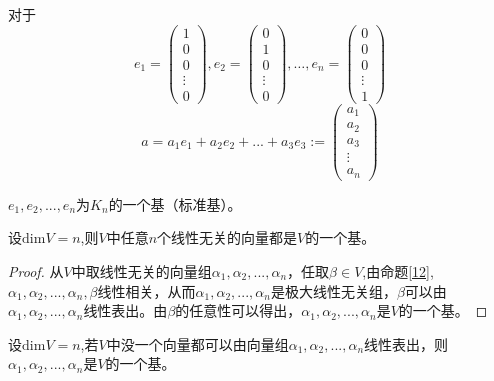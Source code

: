 \documentclass[blue,normal,cn]{elegantnote}
\begin{document}
对于
$$
     e_1=\begin{pmatrix} 
            1\\
            0\\
            0\\
            \vdots\\
            0
         \end{pmatrix}
         ,e_2=\begin{pmatrix} 
                0\\
                1\\
                0\\
                \vdots\\
                0
            \end{pmatrix}
            ,\dots
        ,e_n=\begin{pmatrix} 
            0\\
            0\\
            0\\
            \vdots\\
            1
         \end{pmatrix}
$$
$$
    a=a_1e_1+a_2e_2+...+a_3e_3
    :=\begin{pmatrix} 
        a_1\\
        a_2\\
        a_3\\
        \vdots\\
        a_n
     \end{pmatrix}
$$

$e_1,e_2,...,e_n$为$K_n$的一个基（标准基）。

\begin{proposition}
    设$\mathrm{dim} V=n$,则$V$中任意$n$个线性无关的向量都是$V$的一个基。
\end{proposition}

\begin{proof}
    从$V$中取线性无关的向量组$α_1,α_2,...,α_n$，任取$β \in V$,由命题\ref{12},$α_1,α_2,...,α_n,β$线性相关，从而$α_1,α_2,...,α_n$是极大线性无关组，$β$可以由$α_1,α_2,...,α_n$线性表出。由$β$的任意性可以得出，$α_1,α_2,...,α_n$是$V$的一个基。
\end{proof}
    


\begin{proposition}
    设$\mathrm{dim} V=n$,若$V$中没一个向量都可以由向量组$α_1,α_2,...,α_n$线性表出，则$α_1,α_2,...,α_n$是$V$的一个基。
\end{proposition}
\end{document}
